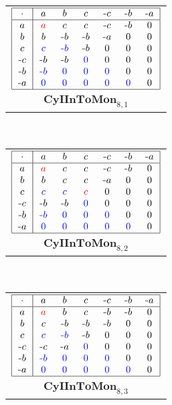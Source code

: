 \documentclass{amsart}
\newcommand{\g}{\textcolor{blue}}
\newcommand{\rd}{\textcolor{red}}
\newcommand{\m}{\rule[2pt]{3pt}{.5pt}\mkern1mu}
\newcommand{\W}[1]{\makebox[12pt]{$#1$}}%
\begin{document}
\ 
\begin{tabular}[b]{c}
$\begin{array}{|c|cccccc|}\hline
\W{\cdot}&\W{a}&\W{b}&\W{c}&\W{\m c}&\W{\m b}&\W{\m a}\\\hline
a&\rd{a}&c&c&\m c&\m b&0\\
b&b&\m b&\m b&\m a&0&0\\
c&\g{c}&\g{\m b}&\m b&0&0&0\\
\m c&\m b&\m b&\g{0}&0&0&0\\
\m b&\g{\m b}&\g{0}&\g{0}&\g{0}&0&0\\
\m a&\g{0}&\g{0}&\g{0}&\g{0}&\g{0}&0\\
\hline
\end{array}$\\
$\mathbf{CyIInToMon}_{8,1}$
\end{tabular}
\ 
\ 
\begin{tabular}[b]{c}
$\begin{array}{|c|cccccc|}\hline
\W{\cdot}&\W{a}&\W{b}&\W{c}&\W{\m c}&\W{\m b}&\W{\m a}\\\hline
a&\rd{a}&c&c&\m c&\m b&0\\
b&b&c&c&\m a&0&0\\
c&\g{c}&\g{c}&\rd{c}&0&0&0\\
\m c&\m b&\m b&\g{0}&0&0&0\\
\m b&\g{\m b}&\g{0}&\g{0}&\g{0}&0&0\\
\m a&\g{0}&\g{0}&\g{0}&\g{0}&\g{0}&0\\
\hline
\end{array}$\\
$\mathbf{CyIInToMon}_{8,2}$
\end{tabular}
\ 
\ 
\begin{tabular}[b]{c}
$\begin{array}{|c|cccccc|}\hline
\W{\cdot}&\W{a}&\W{b}&\W{c}&\W{\m c}&\W{\m b}&\W{\m a}\\\hline
a&\rd{a}&b&c&\m b&\m b&0\\
b&c&\m b&\m b&\m b&0&0\\
c&\g{c}&\g{\m b}&\m b&0&0&0\\
\m c&\m c&\m a&\g{0}&0&0&0\\
\m b&\g{\m b}&\g{0}&\g{0}&\g{0}&0&0\\
\m a&\g{0}&\g{0}&\g{0}&\g{0}&\g{0}&0\\
\hline
\end{array}$\\
$\mathbf{CyIInToMon}_{8,3}$
\end{tabular}
\end{document}

